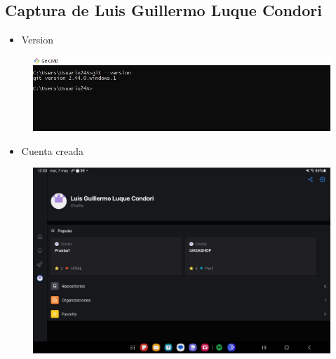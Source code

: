 \documentclass{article}
\begin{document}
	\subsection{Captura de Luis Guillermo Luque Condori}
	\begin{itemize}
		\item Version
	\end{itemize}
	\begin{figure}[H]
		\centering
		\includegraphics[width=1.0\textwidth,keepaspectratio]{img/LuisVersion.jpg}
	\end{figure}
	\begin{itemize}
		\item Cuenta creada
	\end{itemize}
	\begin{figure}[H]
		\centering
		\includegraphics[width=1.0\textwidth,keepaspectratio]{img/LuisCuenta.jpg}
	\end{figure}
	\clearpage
\end{document}
